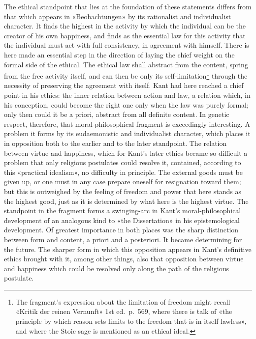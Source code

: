 \documentclass[12pt,a4paper]{article}
\newcommand{\opage}[1]{\marginnote{\footnotesize\textit{[#1]}}}
\begin{document}
The ethical standpoint that lies at the foundation of these statements
differs from that which appears in «Beobachtungen» by its rationalist and
individualist character. It finds the highest in the activity by which the
individual can be the creator of his own happiness, and finds as the
essential law for this activity that the individual must act with full
consistency, in agreement with himself. There is here made an essential
step in the direction of laying the chief weight on the formal side of the
ethical. The ethical law shall abstract from the content, spring from the
free activity itself, and can then be only its
self-limitation\footnote{The fragment's expression about the limitation of
freedom might recall «Kritik der reinen Vernunft» 1st ed.\ p.\ 569, where
there is talk of «the principle by which reason sets limits to the freedom
that is in itself lawless», and where the Stoic sage is mentioned as an
ethical ideal.} through the necessity of preserving the agreement with
itself. Kant had here reached a chief point in his ethics: the inner
relation between action and law, a relation which, in his conception, could
become the right one only when the law was purely formal; only then could it
be a priori, abstract from all definite content. In genetic respect,
therefore, that moral-philosophical fragment is exceedingly interesting. A
problem it forms by its eudaemonistic and individualist character, which
places it in opposition both to the earlier and to the later standpoint. The
relation between virtue and happiness, which for Kant's later ethics became
so difficult a problem that only religious postulates could resolve it,
contained, according to this «practical idealism», no difficulty in
principle. The external goods must be given up, or one must in any case
prepare oneself for resignation toward them; but this is outweighed by the
feeling of freedom and power that here stands as the highest good, just as it
is determined by what here is the highest virtue. The standpoint in the
fragment forms a swinging-arc in Kant's moral-philosophical development of an
analogous kind to «the Dissertation» in his epistemological development. Of
greatest importance in both places was the sharp distinction between form and
content, a priori and a posteriori. It became determining for the future.
The sharper \opage{44}form in which this opposition appears in Kant's definitive
ethics brought with it, among other things, also that opposition between
virtue and happiness which could be resolved only along the path of the
religious postulate.
\end{document}
